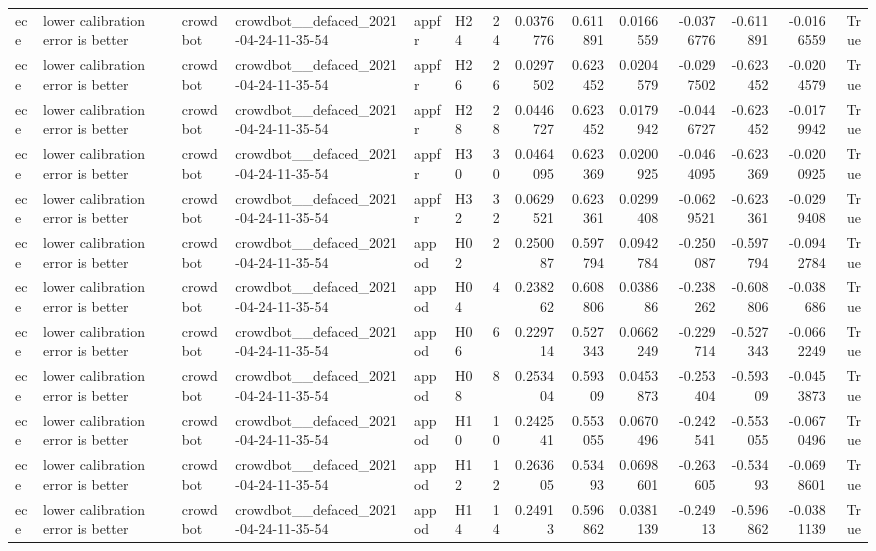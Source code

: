 \begin{longtable}{llllllrrrrrrrr}
ece & lower calibration error is better & crowdbot & crowdbot\_\_defaced\_2021-04-24-11-35-54 & appfr & H24 & 24 & 0.0376776 & 0.611891 & 0.0166559 & -0.0376776 & -0.611891 & -0.0166559 & True \\
ece & lower calibration error is better & crowdbot & crowdbot\_\_defaced\_2021-04-24-11-35-54 & appfr & H26 & 26 & 0.0297502 & 0.623452 & 0.0204579 & -0.0297502 & -0.623452 & -0.0204579 & True \\
ece & lower calibration error is better & crowdbot & crowdbot\_\_defaced\_2021-04-24-11-35-54 & appfr & H28 & 28 & 0.0446727 & 0.623452 & 0.0179942 & -0.0446727 & -0.623452 & -0.0179942 & True \\
ece & lower calibration error is better & crowdbot & crowdbot\_\_defaced\_2021-04-24-11-35-54 & appfr & H30 & 30 & 0.0464095 & 0.623369 & 0.0200925 & -0.0464095 & -0.623369 & -0.0200925 & True \\
ece & lower calibration error is better & crowdbot & crowdbot\_\_defaced\_2021-04-24-11-35-54 & appfr & H32 & 32 & 0.0629521 & 0.623361 & 0.0299408 & -0.0629521 & -0.623361 & -0.0299408 & True \\
ece & lower calibration error is better & crowdbot & crowdbot\_\_defaced\_2021-04-24-11-35-54 & appod & H02 & 2 & 0.250087 & 0.597794 & 0.0942784 & -0.250087 & -0.597794 & -0.0942784 & True \\
ece & lower calibration error is better & crowdbot & crowdbot\_\_defaced\_2021-04-24-11-35-54 & appod & H04 & 4 & 0.238262 & 0.608806 & 0.038686 & -0.238262 & -0.608806 & -0.038686 & True \\
ece & lower calibration error is better & crowdbot & crowdbot\_\_defaced\_2021-04-24-11-35-54 & appod & H06 & 6 & 0.229714 & 0.527343 & 0.0662249 & -0.229714 & -0.527343 & -0.0662249 & True \\
ece & lower calibration error is better & crowdbot & crowdbot\_\_defaced\_2021-04-24-11-35-54 & appod & H08 & 8 & 0.253404 & 0.59309 & 0.0453873 & -0.253404 & -0.59309 & -0.0453873 & True \\
ece & lower calibration error is better & crowdbot & crowdbot\_\_defaced\_2021-04-24-11-35-54 & appod & H10 & 10 & 0.242541 & 0.553055 & 0.0670496 & -0.242541 & -0.553055 & -0.0670496 & True \\
ece & lower calibration error is better & crowdbot & crowdbot\_\_defaced\_2021-04-24-11-35-54 & appod & H12 & 12 & 0.263605 & 0.53493 & 0.0698601 & -0.263605 & -0.53493 & -0.0698601 & True \\
ece & lower calibration error is better & crowdbot & crowdbot\_\_defaced\_2021-04-24-11-35-54 & appod & H14 & 14 & 0.24913 & 0.596862 & 0.0381139 & -0.24913 & -0.596862 & -0.0381139 & True \\

\end{longtable}
